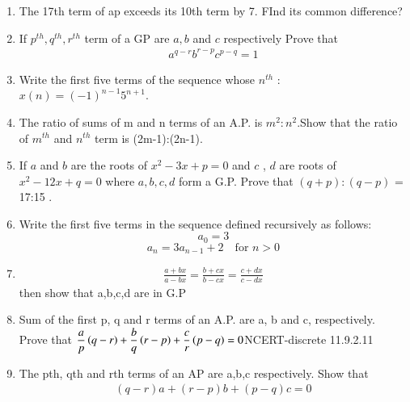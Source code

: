 \begin{enumerate}[label=\thesection.\arabic*,ref=\thesection.\theenumi]
\item The 17th term of ap exceeds its 10th term by 7. FInd its common difference?\\
 \solution

 \pagebreak
 \item If $p^{th},q^{th},r^{th} $ term of a GP are $a,b$ and $c$  respectively Prove that \\
\begin{align*}
    a^{q-r}b^{r-p}c^{p-q}=1
\end{align*}
\solution

\pagebreak

\item Write the first five terms of the sequence whose $n^{th}$  : $x(n) = (-1)^{n-1}5^{n+1}$.\\
\solution

\pagebreak
\item The ratio of sums of m and n terms of an A.P. is $m^2:n^2$.Show
that the ratio of $m^{th}$ and $n^{th}$ term is (2m-1):(2n-1).\\
\solution
\pagebreak

\item If $a$ and $b$ are the roots of $x^{2} -3x + p = 0$ and $c$ , $d$ are roots of $x^{2} - 12x + q = 0$ where $a,b,c,d$ form a G.P. Prove that $(q+p) : (q-p)$ = 17:15 .\\
\solution

\pagebreak


\item Write the first five terms in the sequence defined recursively as follows:
\[ a_{0} = 3 \]
\[ a_{n} = 3a_{n-1} + 2 \quad \text{for } n > 0 \]
\solution 
\pagebreak


\item \begin{align}
\frac{a+bx}{a-bx}=\frac{b+cx}{b-cx}=\frac{c+dx}{c-dx}
\end{align}
then show that a,b,c,d are in G.P\\
\solution

\pagebreak


\item Sum of the first p, q and r terms of an A.P. are a, b and c, respectively.\\
Prove that $\dfrac{a}{p}\left(q-r\right)+\dfrac{b}{q}\left(r-p\right)+\dfrac{c}{r}\left(p-q\right)=0$\hfill{NCERT-discrete 11.9.2.11}\\
\solution

\pagebreak

\item The pth, qth and rth terms of an AP are a,b,c respectively. Show that
\begin{align*} (q-r)a + (r-p)b +(p-q)c =0 \end{align*}
\solution

\pagebreak


\end{enumerate}
